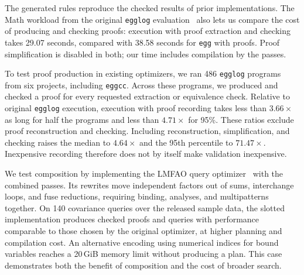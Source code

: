 The generated rules reproduce the checked results of prior implementations.
The Math workload from the original \texttt{egglog} evaluation~\cite{egglog}
  also lets us compare the cost of producing and checking proofs:
  execution with proof extraction and checking takes 29.07 seconds,
  compared with 38.58 seconds for \texttt{egg} with proofs.
Proof simplification is disabled in both; our time includes compilation by the passes.

To test proof production in existing optimizers, we ran
  486 \texttt{egglog} programs from six projects, including \texttt{eggcc}.
Across these programs,
  we produced and checked a proof for every requested extraction or equivalence check.
Relative to original \texttt{egglog} execution, execution with proof recording takes
  less than $3.66\times$ as long for half the programs and less than $4.71\times$ for 95\%.
These ratios exclude proof reconstruction and checking.
Including reconstruction, simplification, and checking raises the median to $4.64\times$
  and the 95th percentile to $71.47\times$.
Inexpensive recording therefore does not by itself make validation inexpensive.

We test composition by implementing the LMFAO query optimizer~\cite{lmfao}
  with the combined passes.
Its rewrites move independent factors out of sums, interchange loops, and fuse reductions,
  requiring binding, analyses, and multipatterns together.
On 140 covariance queries over the released sample data, the slotted implementation produces
  checked proofs and queries with performance comparable to those chosen by the original optimizer,
  at higher planning and compilation cost.
An alternative encoding using numerical indices for bound variables
  reaches a 20\,GiB memory limit without producing a plan.
This case demonstrates both the benefit of composition and the cost of broader search.

